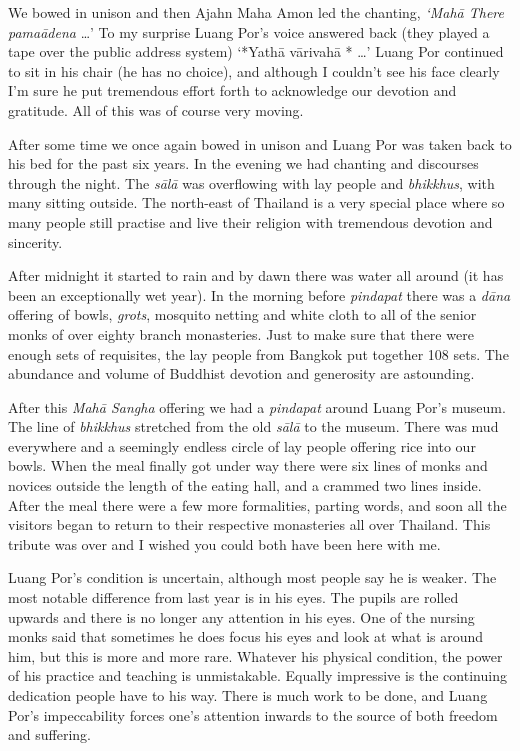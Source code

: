 We bowed in unison and then Ajahn Maha Amon led the chanting,
\emph{`Mahā There pamaādena} \ldots{}' To my surprise Luang Por's voice
answered back (they played a tape over the public address system)
`*Yathā vārivahā * \ldots{}' Luang Por continued to sit in his chair (he
has no choice), and although I couldn't see his face clearly I'm sure he
put tremendous effort forth to acknowledge our devotion and gratitude.
All of this was of course very moving.

After some time we once again bowed in unison and Luang Por was taken
back to his bed for the past six years. In the evening we had chanting
and discourses through the night. The \emph{sālā} was overflowing with
lay people and \emph{bhikkhus}, with many sitting outside. The
north-east of Thailand is a very special place where so many people
still practise and live their religion with tremendous devotion and
sincerity.

After midnight it started to rain and by dawn there was water all around
(it has been an exceptionally wet year). In the morning before
\emph{pindapat} there was a \emph{dāna} offering of bowls, \emph{grots},
mosquito netting and white cloth to all of the senior monks of over
eighty branch monasteries. Just to make sure that there were enough sets
of requisites, the lay people from Bangkok put together 108 sets. The
abundance and volume of Buddhist devotion and generosity are astounding.

After this \emph{Mahā Sangha} offering we had a \emph{pindapat} around
Luang Por's museum. The line of \emph{bhikkhus} stretched from the old
\emph{sālā} to the museum. There was mud everywhere and a seemingly
endless circle of lay people offering rice into our bowls. When the meal
finally got under way there were six lines of monks and novices outside
the length of the eating hall, and a crammed two lines inside. After the
meal there were a few more formalities, parting words, and soon all the
visitors began to return to their respective monasteries all over
Thailand. This tribute was over and I wished you could both have been
here with me.

Luang Por's condition is uncertain, although most people say he is
weaker. The most notable difference from last year is in his eyes. The
pupils are rolled upwards and there is no longer any attention in his
eyes. One of the nursing monks said that sometimes he does focus his
eyes and look at what is around him, but this is more and more rare.
Whatever his physical condition, the power of his practice and teaching
is unmistakable. Equally impressive is the continuing dedication people
have to his way. There is much work to be done, and Luang Por's
impeccability forces one's attention inwards to the source of both
freedom and suffering.


